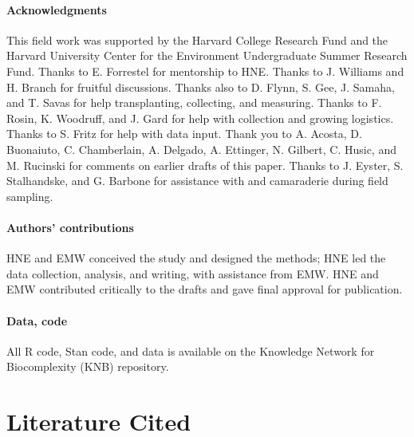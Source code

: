 \documentclass[12pt]{article}\usepackage[]{graphicx}\usepackage[]{color}
\begin{document}
\paragraph{Acknowledgments}
This field work was supported by the Harvard College Research Fund and the Harvard University Center for the Environment Undergraduate Summer Research Fund. Thanks to E. Forrestel for mentorship to HNE. Thanks to J. Williams and H. Branch for fruitful discussions. Thanks also to D. Flynn, S. Gee, J. Samaha, and T. Savas for help transplanting, collecting, and measuring. Thanks to F. Rosin, K. Woodruff, and J. Gard for help with collection and growing logistics. Thanks to S. Fritz for help with data input. Thank you to A. Acosta, D. Buonaiuto, C. Chamberlain, A. Delgado, A. Ettinger, N. Gilbert, C. Husic, and M. Rucinski for comments on earlier drafts of this paper. Thanks to J. Eyster, S. Stalhandske, and G. Barbone for assistance with and camaraderie during field sampling. 

\paragraph{Authors' contributions} HNE and EMW conceived the study and designed the methods; HNE led the data collection, analysis, and writing, with assistance from EMW. HNE and EMW contributed critically to the drafts and gave final approval for publication.

\paragraph{Data, code} 
All R code, Stan code, and data is available on the Knowledge Network for Biocomplexity (KNB) repository. 

	

\section{Literature Cited}
\printbibliography
\end{document}
